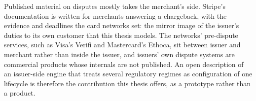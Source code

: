 Published material on disputes mostly takes the merchant's side. Stripe's documentation \cite{stripe} is written
for merchants answering a chargeback, with the evidence and deadlines the card networks set: the mirror image of
the issuer's duties to its own customer that this thesis models. The networks' pre-dispute services, such as
Visa's Verifi and Mastercard's Ethoca, sit between issuer and merchant rather than inside the issuer, and issuers'
own dispute systems are commercial products whose internals are not published. An open description of an
issuer-side engine that treats several regulatory regimes as configuration of one lifecycle is therefore the
contribution this thesis offers, as a prototype rather than a product.

